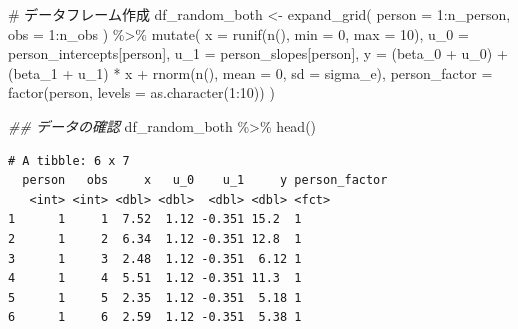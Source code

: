 \documentclass[
  a4paper,
]{ltjsbook}
\newenvironment{Shaded}{\begin{snugshade}}{\end{snugshade}}
\newcommand{\AttributeTok}[1]{\textcolor[rgb]{0.40,0.45,0.13}{#1}}
\newcommand{\CommentTok}[1]{\textcolor[rgb]{0.37,0.37,0.37}{#1}}
\newcommand{\DecValTok}[1]{\textcolor[rgb]{0.68,0.00,0.00}{#1}}
\newcommand{\DocumentationTok}[1]{\textcolor[rgb]{0.37,0.37,0.37}{\textit{#1}}}
\newcommand{\FunctionTok}[1]{\textcolor[rgb]{0.28,0.35,0.67}{#1}}
\newcommand{\NormalTok}[1]{\textcolor[rgb]{0.00,0.23,0.31}{#1}}
\newcommand{\OtherTok}[1]{\textcolor[rgb]{0.00,0.23,0.31}{#1}}
\newcommand{\SpecialCharTok}[1]{\textcolor[rgb]{0.37,0.37,0.37}{#1}}
\begin{document}
\begin{Shaded}
\begin{Highlighting}[]
\CommentTok{\# データフレーム作成}
\NormalTok{df\_random\_both }\OtherTok{\textless{}{-}} \FunctionTok{expand\_grid}\NormalTok{(}
  \AttributeTok{person =} \DecValTok{1}\SpecialCharTok{:}\NormalTok{n\_person,}
  \AttributeTok{obs =} \DecValTok{1}\SpecialCharTok{:}\NormalTok{n\_obs}
\NormalTok{) }\SpecialCharTok{\%\textgreater{}\%}
  \FunctionTok{mutate}\NormalTok{(}
    \AttributeTok{x =} \FunctionTok{runif}\NormalTok{(}\FunctionTok{n}\NormalTok{(), }\AttributeTok{min =} \DecValTok{0}\NormalTok{, }\AttributeTok{max =} \DecValTok{10}\NormalTok{),}
    \AttributeTok{u\_0 =}\NormalTok{ person\_intercepts[person],}
    \AttributeTok{u\_1 =}\NormalTok{ person\_slopes[person],}
    \AttributeTok{y =}\NormalTok{ (beta\_0 }\SpecialCharTok{+}\NormalTok{ u\_0) }\SpecialCharTok{+}\NormalTok{ (beta\_1 }\SpecialCharTok{+}\NormalTok{ u\_1) }\SpecialCharTok{*}\NormalTok{ x }\SpecialCharTok{+} \FunctionTok{rnorm}\NormalTok{(}\FunctionTok{n}\NormalTok{(), }\AttributeTok{mean =} \DecValTok{0}\NormalTok{, }\AttributeTok{sd =}\NormalTok{ sigma\_e),}
    \AttributeTok{person\_factor =} \FunctionTok{factor}\NormalTok{(person, }\AttributeTok{levels =} \FunctionTok{as.character}\NormalTok{(}\DecValTok{1}\SpecialCharTok{:}\DecValTok{10}\NormalTok{))}
\NormalTok{  )}

\DocumentationTok{\#\# データの確認}
\NormalTok{df\_random\_both }\SpecialCharTok{\%\textgreater{}\%} \FunctionTok{head}\NormalTok{()}
\end{Highlighting}
\end{Shaded}

\begin{verbatim}
# A tibble: 6 x 7
  person   obs     x   u_0    u_1     y person_factor
   <int> <int> <dbl> <dbl>  <dbl> <dbl> <fct>        
1      1     1  7.52  1.12 -0.351 15.2  1            
2      1     2  6.34  1.12 -0.351 12.8  1            
3      1     3  2.48  1.12 -0.351  6.12 1            
4      1     4  5.51  1.12 -0.351 11.3  1            
5      1     5  2.35  1.12 -0.351  5.18 1            
6      1     6  2.59  1.12 -0.351  5.38 1            
\end{verbatim}
\end{document}
